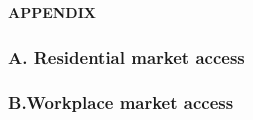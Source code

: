 \documentclass[
  11pt]{article}
\begin{document}
\begin{center}

{\large\bf APPENDIX}

\end{center}

\subsubsection*{A. Residential market
access}\label{a.-residential-market-access}



\clearpage

\subsubsection*{B.Workplace market
access}\label{b.workplace-market-access}


\end{document}
